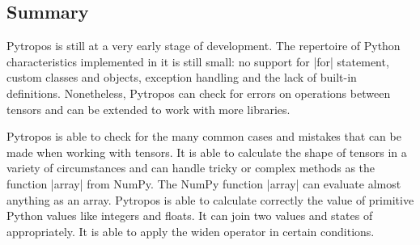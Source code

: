 \subsection{Summary}

Pytropos is still at a very early stage of development. The repertoire of Python
characteristics implemented in it is still small: no support for \pycode|for| statement, custom classes and
objects, exception handling and the lack of built-in definitions. Nonetheless, Pytropos
can check for errors on operations between tensors and can be extended to work with more
libraries.

Pytropos is able to check for the many common cases and mistakes that can be made when
working with tensors. It is able to calculate the shape of tensors in a variety of
circumstances and can handle tricky or complex methods as the function \pycode|array| from
NumPy. The NumPy function \pycode|array| can evaluate almost anything as an array.
Pytropos is able to calculate correctly the value of primitive Python values like
integers and floats. It can join two values and states of appropriately. It is able to
apply the widen operator in certain conditions.
